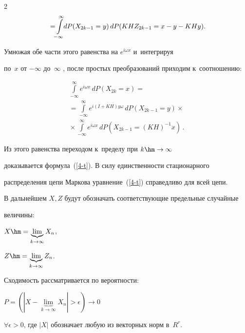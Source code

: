 \begin{multicols}{2}
\begin{multline*}
{}=\!\!\int\limits^\infty_{-\infty}\!\!

dP(X_{2k-1}=y)\,dP(KHZ_{2k-1}=x-y-KHy).\hspace*{-1.2pt}

\end{multline*}

Умножая обе части этого равенства на $e^{i \omega x}$ и~интегрируя

по~$x$ от $-\infty$ до~$\infty$ , после простых преобразований приходим к~соотношению:



\noindent

\begin{multline*}

\int\limits^\infty_{-\infty}\!\!e^{i \omega x} \,dP(X_{2k}=x)={}\\

{}=\int\limits^\infty_{-\infty}\!\!e^{i(I+KH)y\omega}\,dP(X_{2k-1}=y)\times{}\\

{}\times

\int\limits^\infty_{-\infty}\!\!e^{i \omega x} \,dP(X_{2k-1}=(KH)^{-1}x)\,.

\end{multline*}

Из этого равенства переходом к~пределу при $k\hm\rightarrow \infty$

доказывается формула~(\ref{4-t}). В силу единственности стационарного

распределения цепи Маркова уравнение~(\ref{4-t}) справедливо для всей цепи.



\smallskip



В дальнейшем $X, Z$ будут обозначать соответствующие предельные случайные

величины:

$X\hm=\underbrace{\lim}_{k\rightarrow \infty}X_n$,

$Z\hm=\underbrace{\lim}_{k\rightarrow \infty}Z_n$.



Сходимость рассматривается по вероятности:

$P=(|X-\underbrace{\lim}_{k\rightarrow \infty}X_n|>\epsilon)\rightarrow 0$

$\forall\epsilon > 0$, где $|X|$ обозначает любую из векторных норм в~$R^r$.



\smallskip




\end{multicols}
